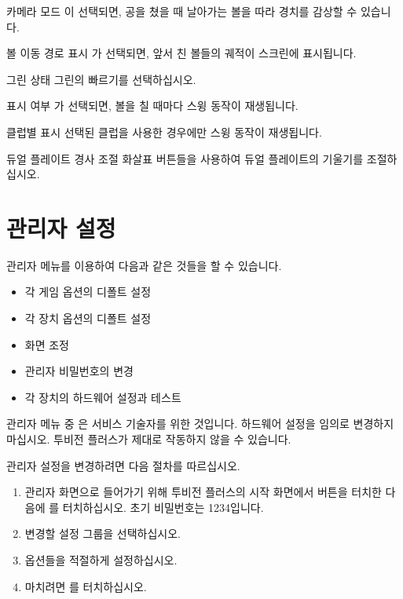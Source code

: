 \documentclass[10pt, openright, language=korean]{hzguide}
\begin{document}

\begin{UI}
\item[카메라 모드] 이 선택되면, 공을 쳤을 때 날아가는 볼을 따라 경치를 감상할 수 있습니다.
\item[볼 이동 경로 표시] 가 선택되면, 앞서 친 볼들의 궤적이 스크린에 표시됩니다.
\item[그린 상태] 그린의 빠르기를 선택하십시오.
\item[표시 여부] 가 선택되면, 볼을 칠 때마다 스윙 동작이 재생됩니다.
\item[클럽별 표시] 선택된 클럽을 사용한 경우에만 스윙 동작이 재생됩니다.
\item[듀얼 플레이트 경사 조절] 화살표 버튼들을 사용하여 듀얼 플레이트의 기울기를 조절하십시오.
\end{UI}


\chapter{관리자 설정}

관리자 메뉴를 이용하여 다음과 같은 것들을 할 수 있습니다.

\begin{itemize}
\item 각 게임 옵션의 디폴트 설정
\item 각 장치 옵션의 디폴트 설정
\item 화면 조정
\item 관리자 비밀번호의 변경
\item 각 장치의 하드웨어 설정과 테스트
\end{itemize}

\begin{Caution}
관리자 메뉴 중 은 서비스 기술자를 위한 것입니다.
하드웨어 설정을 임의로 변경하지 마십시오. 투비전 플러스가 제대로 작동하지 않을 수 있습니다.
\end{Caution}

관리자 설정을 변경하려면 다음 절차를 따르십시오.

\begin{enumerate}
\item 관리자 화면으로 들어가기 위해 투비전 플러스의 시작 화면에서  버튼을 터치한 다음에 를 터치하십시오. 초기 비밀번호는 1234입니다.
\item 변경할 설정 그룹을 선택하십시오.
\item 옵션들을 적절하게 설정하십시오.
\item 마치려면 를 터치하십시오.
\end{enumerate}
\end{document}

